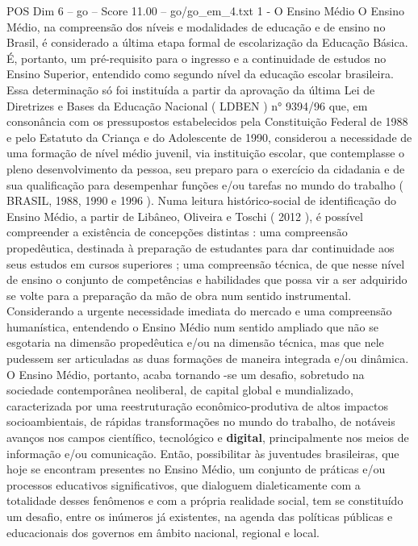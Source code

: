 \begin{textsample}{POS Dim 6 – go – Score 11.00 – go/go\_em\_4.txt}  \label{ex:f6_pos_113}
1 - O Ensino Médio O Ensino Médio, na compreensão dos níveis e modalidades de educação e de ensino no Brasil, é considerado a última etapa formal de escolarização da Educação Básica.
É, portanto, um pré-requisito para o ingresso e a continuidade de estudos no Ensino Superior, entendido como segundo nível da educação escolar brasileira.
Essa determinação só foi instituída a partir da aprovação da última Lei de Diretrizes e Bases da Educação Nacional ( LDBEN ) n{\EmojiFont °} 9394/96 que, em consonância com os pressupostos estabelecidos pela Constituição Federal de 1988 e pelo Estatuto da Criança e do Adolescente de 1990, considerou a necessidade de uma formação de nível médio juvenil, via instituição escolar, que contemplasse o pleno desenvolvimento da pessoa, seu preparo para o exercício da cidadania e de sua qualificação para desempenhar funções e/ou tarefas no mundo do trabalho ( BRASIL, 1988, 1990 e 1996 ).
Numa leitura histórico-social de identificação do Ensino Médio, a partir de Libâneo, Oliveira e Toschi ( 2012 ), é possível compreender a existência de concepções distintas : uma compreensão propedêutica, destinada à preparação de estudantes para dar continuidade aos seus estudos em cursos superiores ; uma compreensão técnica, de que nesse nível de ensino o conjunto de competências e habilidades que possa vir a ser adquirido se volte para a preparação da mão de obra num sentido instrumental.
Considerando a urgente necessidade imediata do mercado e uma compreensão humanística, entendendo o Ensino Médio num sentido ampliado que não se esgotaria na dimensão propedêutica e/ou na dimensão técnica, mas que nele pudessem ser articuladas as duas formações de maneira integrada e/ou dinâmica.
O Ensino Médio, portanto, acaba tornando -se um desafio, sobretudo na sociedade contemporânea neoliberal, de capital global e mundializado, caracterizada por uma reestruturação econômico-produtiva de altos impactos socioambientais, de rápidas transformações no mundo do trabalho, de notáveis avanços nos campos científico, tecnológico e \textbf{digital}, principalmente nos meios de informação e/ou comunicação.
Então, possibilitar às juventudes brasileiras, que hoje se encontram presentes no Ensino Médio, um conjunto de práticas e/ou processos educativos significativos, que dialoguem dialeticamente com a totalidade desses fenômenos e com a própria realidade social, tem se constituído um desafio, entre os inúmeros já existentes, na agenda das políticas públicas e educacionais dos governos em âmbito nacional, regional e local.

\end{textsample}
